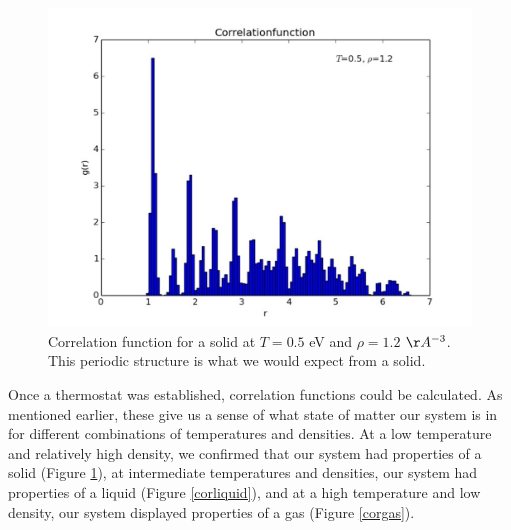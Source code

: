 \documentclass{article}
\begin{document}
\begin{multicols}{2}
\begin{figure}[H]
\begin{center}
\includegraphics[width=\linewidth]{plots/correlationfunctionT05rho12x.pdf}
\caption{Correlation function for a solid at $T=0.5$ eV and $\rho=1.2$ $\AA ^{-3}$.  This periodic structure is what we would expect from a solid.}
\label{corsolid}
\end{center}
\end{figure}

Once a thermostat was established, correlation functions could be calculated.  As mentioned earlier, these give us a sense of what state of matter our system is in for different combinations of temperatures and densities.  At a low temperature and relatively high density, we confirmed that our system had properties of a solid (Figure \ref{corsolid}), at intermediate temperatures and densities, our system had properties of a liquid (Figure \ref{corliquid}), and at a high temperature and low density, our system displayed properties of a gas (Figure \ref{corgas}).  



\end{multicols}
\end{document}
